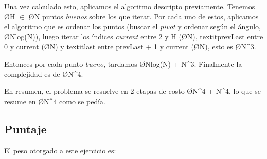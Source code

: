 Una vez calculado esto, aplicamos el algoritmo descripto previamente. Tenemos \O{H} $\in$ \O{N} puntos \textit{buenos} sobre los que iterar. Por cada uno de estos, aplicamos el algoritmo que es ordenar los puntos (buscar el \textit{pivot} y ordenar según el ángulo, \O{Nlog(N)}), luego iterar los índices \textit{current} entre 2 y H (\O{N}), textit{prevLast} entre 0 y current (\O{N}) y textit{last} entre prevLast + 1 y current (\O{N}), esto es \O{N^3}.

Entonces por cada punto \textit{bueno}, tardamos \O{Nlog(N) + N^3}. Finalmente la complejidad es de \O{N^4}.

En resumen, el problema se resuelve en 2 etapas de costo \O{N^4 + N^4}, lo que se resume en \O{N^4} como se pedía.

\subsection{Puntaje}
El peso otorgado a este ejercicio es:
